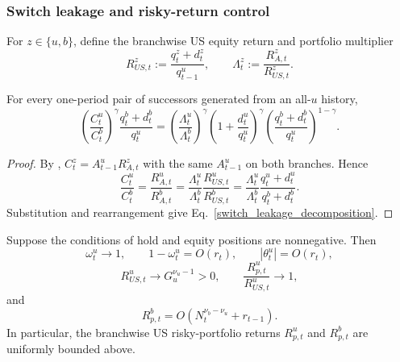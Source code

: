 \documentclass{article}
\def\green#1{#1}%
\begin{document}
\subsubsection{\green{Switch leakage and risky-return} control}

For $z\in\{u,b\}$, define the branchwise US equity return and portfolio multiplier
\begin{equation}\label{portfolio_multiplier_def}
R_{US,t}^z
:=
\frac{q_t^z+d_t^z}{q_{t-1}^u},
\qquad
\Lambda_t^z
:=
\frac{R_{A,t}^z}{R_{US,t}^z}.
\end{equation}

\begin{lem}\label{lem_switch_leakage_decomposition}
For every one-period pair of successors generated from an all-$u$ history,
\begin{equation}\label{switch_leakage_decomposition}
\boxed{
\left(\frac{C_t^u}{C_t^b}\right)^\gamma
\frac{q_t^b+d_t^b}{q_t^u}
=
\left(\frac{\Lambda_t^u}{\Lambda_t^b}\right)^\gamma
\left(1+\frac{d_t^u}{q_t^u}\right)^\gamma
\left(\frac{q_t^b+d_t^b}{q_t^u}\right)^{1-\gamma}.
}
\end{equation}
\end{lem}

\begin{proof}
By , $C_t^z=A_{t-1}^uR_{A,t}^z$ with the same $A_{t-1}^u$ on both branches.  Hence
\[
\frac{C_t^u}{C_t^b}
=
\frac{R_{A,t}^u}{R_{A,t}^b}
=
\frac{\Lambda_t^u}{\Lambda_t^b}
\frac{R_{US,t}^u}{R_{US,t}^b}
=
\frac{\Lambda_t^u}{\Lambda_t^b}
\frac{q_t^u+d_t^u}{q_t^b+d_t^b}.
\]
Substitution and rearrangement give Eq.~\eqref{switch_leakage_decomposition}.
\end{proof}

\begin{lem}\label{lem_risky_return_bounds}
Suppose the conditions of  hold and equity positions are nonnegative.  Then
\begin{equation}\label{omega_US_concentration}
\omega_t^u\to1,
\qquad
\green{1-\omega}_\green{t}^\green{u=O}(\green{r}_\green{t}),
\qquad
|\theta_t^u|\green{=O}(\green{r}_\green{t}),
\end{equation}
\begin{equation}\label{continuation_return_reduction}
R_{US,t}^u\longrightarrow G_u^{\nu_u-1}>0,
\qquad
\frac{R_{p,t}^u}{R_{US,t}^u}\longrightarrow1,
\end{equation}
and
\begin{equation}\label{switch_risky_return_order}
\boxed{
\green{R}_{\green{p},\green{t}}^\green{b}
\green{=}
\green{O}\left(
\green{N}_\green{t}^{\green{\nu}_\green{b-\nu}_\green{u}}\green{+r}_{\green{t-1}}
\right).
}
\end{equation}
\green{In particular}, the branchwise US risky-portfolio returns $R_{p,t}^u$ and $R_{p,t}^b$ are uniformly bounded above.
\end{lem}
\end{document}
